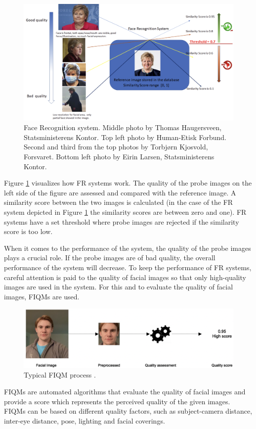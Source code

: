 \begin{figure}[h]
    \centering
    \includegraphics[scale = 0.38]{figures/Erna.png}
    \caption{Face Recognition system. Middle photo by Thomas Haugersveen, Statsministerens Kontor. Top left photo by Human-Etisk Forbund. Second and third from the top photos by Torbjørn Kjosvold, Forsvaret. Bottom left photo by Eirin Larsen, Statsministerens Kontor.}
    \label{fig:erna}
\end{figure}

Figure \ref{fig:erna} visualizes how FR systems work. The quality of the probe images on the left side of the figure are assessed and compared with the reference image. A similarity score between the two images is calculated (in the case of the FR system depicted in Figure \ref{fig:erna} the similarity scores are between zero and one). FR systems have a set threshold where probe images are rejected if the similarity score is too low. 

When it comes to the performance of the system, the quality of the probe images plays a crucial role. If the probe images are of bad quality, the overall performance of the system will decrease. To keep the performance of FR systems, careful attention is paid to the quality of facial images so that only high-quality images are used in the system. For this and to evaluate the quality of facial images, FIQMs are used.
%
\begin{figure}[h]
    \centering
    \includegraphics[scale = 0.45]{figures/FIQM_process.png}
    \caption{Typical FIQM process \cite{FaceImageQualityAssessment}.}
    \label{fig:fiqm}
\end{figure}
%
FIQMs are automated algorithms that evaluate the quality of facial images and provide a score which represents the perceived quality of the given images. FIQMs can be based on different quality factors, such as subject-camera distance, inter-eye distance, pose, lighting and facial coverings. %

